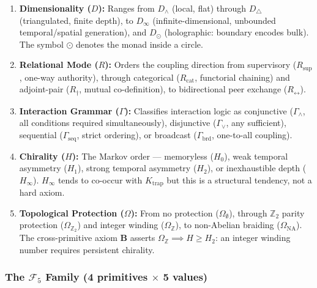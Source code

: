\documentclass[12pt,a4paper]{article}
\begin{document}
\begin{enumerate}
    \item \textbf{Dimensionality ($D$):} Ranges from $D_{\wedge}$ (local, flat) through $D_{\triangle}$ (triangulated, finite depth), to $D_{\infty}$ (infinite-dimensional, unbounded temporal/spatial generation), and $D_{\odot}$ (holographic: boundary encodes bulk). The symbol $\odot$ denotes the monad inside a circle.
    \item \textbf{Relational Mode ($R$):} Orders the coupling direction from supervisory ($R_\text{sup}$, one-way authority), through categorical ($R_\text{cat}$, functorial chaining) and adjoint-pair ($R_{\dagger}$, mutual co-definition), to bidirectional peer exchange ($R_{\leftrightarrow}$).
    \item \textbf{Interaction Grammar ($\Gamma$):} Classifies interaction logic as conjunctive ($\Gamma_{\wedge}$, all conditions required simultaneously), disjunctive ($\Gamma_{\vee}$, any sufficient), sequential ($\Gamma_\text{seq}$, strict ordering), or broadcast ($\Gamma_\text{brd}$, one-to-all coupling).
    \item \textbf{Chirality ($H$):} The Markov order --- memoryless ($H_0$), weak temporal asymmetry ($H_1$), strong temporal asymmetry ($H_2$), or inexhaustible depth ($H_{\infty}$). $H_{\infty}$ tends to co-occur with $K_\text{trap}$ but this is a structural tendency, not a hard axiom.
    \item \textbf{Topological Protection ($\Omega$):} From no protection ($\Omega_{\emptyset}$), through $\mathbb{Z}_2$ parity protection ($\Omega_{\mathbb{Z}_2}$) and integer winding ($\Omega_\mathbb{Z}$), to non-Abelian braiding ($\Omega_\text{NA}$). The cross-primitive axiom \textbf{B} asserts $\Omega_\mathbb{Z} \implies H \geq H_2$: an integer winding number requires persistent chirality.
\end{enumerate}

\subsubsection{The $\mathcal{F}_5$ Family (4 primitives $\times$ 5 values)}
\end{document}
